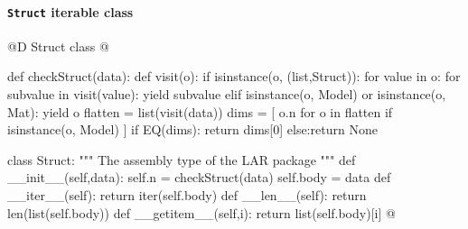 \documentclass[11pt,oneside]{article}	%
\begin{document}
\paragraph{\texttt{Struct} iterable class}
@D Struct class
@{def checkStruct(data):	
	def visit(o):
	    if isinstance(o, (list,Struct)):
	        for value in o:
	            for subvalue in visit(value):
	                yield subvalue
	    elif isinstance(o, Model) or isinstance(o, Mat): 
	    	yield o		
	flatten = list(visit(data))
	dims = [ o.n for o in flatten if isinstance(o, Model) ]
	if EQ(dims): return dims[0] 
	else:return None

class Struct:
    """ The assembly type of the LAR package """
    def __init__(self,data):
        self.n = checkStruct(data)
        self.body = data
    def __iter__(self):
        return iter(self.body)
    def __len__(self):
        return len(list(self.body))
    def __getitem__(self,i):
        return list(self.body)[i]
@}
\end{document}
